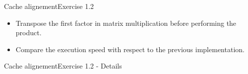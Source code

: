 \documentclass[10pt]{beamer}
\begin{document}
\begin{frame}{Cache alignement}{Exercise 1.2}
\begin{itemize}
\item Transpose the first factor in matrix multiplication before performing the product.
\item Compare the execution speed with respect to the previous implementation.
\end{itemize}
\end{frame}

\begin{frame}{Cache alignement}{Exercise 1.2 - Details}
\begin{figure}
    \centering
    \caption{}
\end{figure}
\end{frame}
\end{document}
